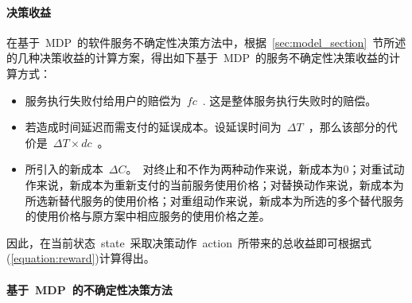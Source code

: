 
\paragraph{决策收益}

在基于~MDP~的软件服务不确定性决策方法中，根据~\ref{sec:model_section}~节所述的几种决策收益的计算方案，得出如下基于~MDP~的服务不确定性决策收益的计算方式：

\begin{itemize}

\item 服务执行失败付给用户的赔偿为~$fc$~. 这是整体服务执行失败时的赔偿。

\item 若造成时间延迟而需支付的延误成本。设延误时间为~$\Delta T$~，那么该部分的代价是~$\Delta T \times dc$~。

\item 所引入的新成本~$\Delta C$。~对终止和不作为两种动作来说，新成本为0；对重试动作来说，新成本为重新支付的当前服务使用价格；对替换动作来说，新成本为所选新替代服务的使用价格；对重组动作来说，新成本为所选的多个替代服务的使用价格与原方案中相应服务的使用价格之差。

\end{itemize}

因此，在当前状态~state~采取决策动作~action~所带来的总收益即可根据式(\ref{equation:reward})计算得出。

\paragraph{基于~MDP~的不确定性决策方法}

